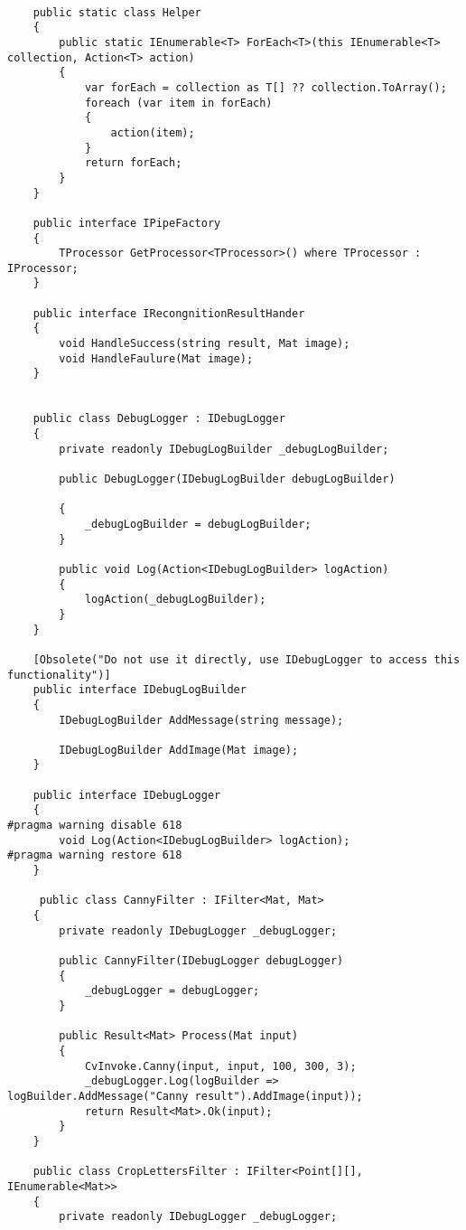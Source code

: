 \begin{lstlisting}[style=fsharpstyle,caption={Исходный код}, label=lst:recognition_result_handler]

    public static class Helper
    {
        public static IEnumerable<T> ForEach<T>(this IEnumerable<T> collection, Action<T> action)
        {
            var forEach = collection as T[] ?? collection.ToArray();
            foreach (var item in forEach)
            {
                action(item);
            }
            return forEach;
        } 
    }

    public interface IPipeFactory
    {
        TProcessor GetProcessor<TProcessor>() where TProcessor : IProcessor;
    }

    public interface IRecongnitionResultHander
    {
        void HandleSuccess(string result, Mat image);
        void HandleFaulure(Mat image);
    }


    public class DebugLogger : IDebugLogger
    {
        private readonly IDebugLogBuilder _debugLogBuilder;

        public DebugLogger(IDebugLogBuilder debugLogBuilder)

        {
            _debugLogBuilder = debugLogBuilder;
        }

        public void Log(Action<IDebugLogBuilder> logAction)
        {
            logAction(_debugLogBuilder);
        }
    }

    [Obsolete("Do not use it directly, use IDebugLogger to access this functionality")]
    public interface IDebugLogBuilder
    {
        IDebugLogBuilder AddMessage(string message);

        IDebugLogBuilder AddImage(Mat image);
    }

    public interface IDebugLogger
    {
#pragma warning disable 618
        void Log(Action<IDebugLogBuilder> logAction);
#pragma warning restore 618
    }

     public class CannyFilter : IFilter<Mat, Mat>
    {
        private readonly IDebugLogger _debugLogger;

        public CannyFilter(IDebugLogger debugLogger)
        {
            _debugLogger = debugLogger;
        }

        public Result<Mat> Process(Mat input)
        {
            CvInvoke.Canny(input, input, 100, 300, 3);
            _debugLogger.Log(logBuilder => logBuilder.AddMessage("Canny result").AddImage(input));
            return Result<Mat>.Ok(input);
        }
    }

    public class CropLettersFilter : IFilter<Point[][], IEnumerable<Mat>>
    {
        private readonly IDebugLogger _debugLogger;


\end{lstlisting}
